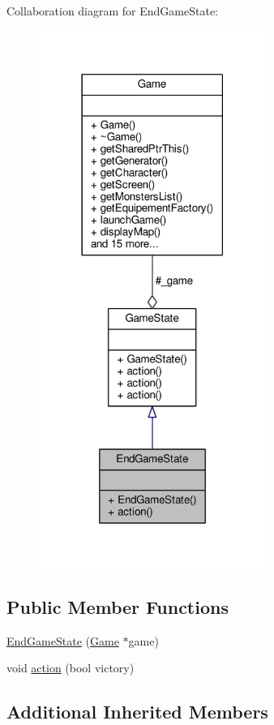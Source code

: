 Collaboration diagram for End\-Game\-State\-:
\nopagebreak
\begin{figure}[H]
\begin{center}
\leavevmode
\includegraphics[width=210pt]{class_end_game_state__coll__graph}
\end{center}
\end{figure}
\subsection*{Public Member Functions}
\begin{DoxyCompactItemize}
\item 
\hyperlink{class_end_game_state_a7fc35d8a99ca2a71031c0fd53de4ba44}{End\-Game\-State} (\hyperlink{class_game}{Game} $\ast$game)
\item 
void \hyperlink{class_end_game_state_a9a47cd234293b4e56e3f93d4b066252a}{action} (bool victory)
\end{DoxyCompactItemize}
\subsection*{Additional Inherited Members}


